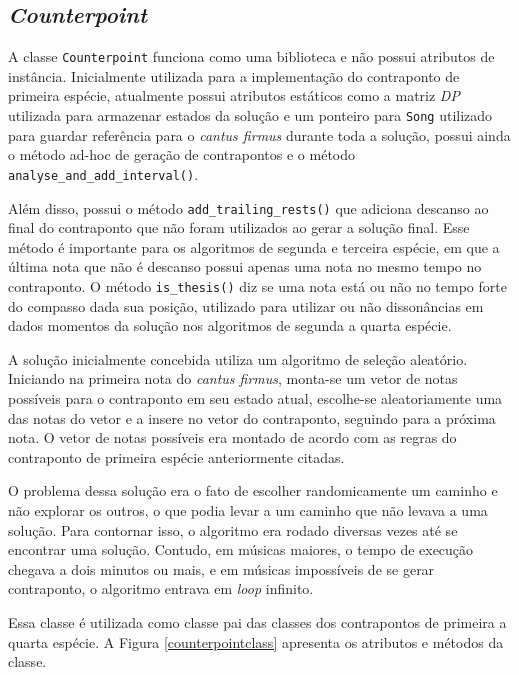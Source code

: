     \subsection[\textit{Counterpoint}]{\textit{Counterpoint}}

    A classe \texttt{Counterpoint} funciona como uma biblioteca e não possui atributos de instância. Inicialmente utilizada para a implementação do contraponto de primeira espécie, atualmente possui atributos estáticos como a matriz \textit{DP} utilizada para armazenar estados da solução e um ponteiro para \texttt{Song} utilizado para guardar referência para o \textit{cantus firmus} durante toda a solução, possui ainda o método ad-hoc de geração de contrapontos e o método \texttt{analyse\_and\_add\_interval()}.

    Além disso, possui o método \texttt{add\_trailing\_rests()} que adiciona descanso ao final do contraponto que não foram utilizados ao gerar a solução final. Esse método é importante para os algoritmos de segunda e terceira espécie, em que a última nota que não é descanso possui apenas uma nota no mesmo tempo no contraponto. O método \texttt{is\_thesis()} diz se uma nota está ou não no tempo forte do compasso dada sua posição, utilizado para utilizar ou não dissonâncias em dados momentos da solução nos algoritmos de segunda a quarta espécie.

    A solução inicialmente concebida utiliza um algoritmo de seleção aleatório. Iniciando na primeira nota do \textit{cantus firmus}, monta-se um vetor de notas possíveis para o contraponto em seu estado atual, escolhe-se aleatoriamente uma das notas do vetor e a insere no vetor do contraponto, seguindo para a próxima nota. O vetor de notas possíveis era montado de acordo com as regras do contraponto de primeira espécie anteriormente citadas.

    O problema dessa solução era o fato de escolher randomicamente um caminho e não explorar os outros, o que podia levar a um caminho que não levava a uma solução. Para contornar isso, o algoritmo era rodado diversas vezes até se encontrar uma solução. Contudo, em músicas maiores, o tempo de execução chegava a dois minutos ou mais, e em músicas impossíveis de se gerar contraponto, o algoritmo entrava em \textit{loop} infinito.

    Essa classe é utilizada como classe pai das classes dos contrapontos de primeira a quarta espécie. A Figura \ref{counterpointclass} apresenta os atributos e métodos da classe.

